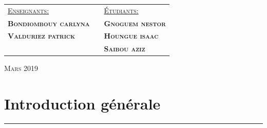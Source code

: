 \documentclass[12pt]{report}
\begin{document}
\begin{center}
		
	
		\vspace{3em}	
		\begin{tabular}{lll}
			\vspace{0.5em}
			 \textsc{\underline{Enseignants:}}	& \hspace{3em}	&	\textsc{\underline{Étudiants:}}		\\ 
			 \textsc{\textbf{\sc Bondiombouy carlyna }} & \hspace{15em}	&	\textsc{\textbf{\sc Gnoguem nestor}}	 \\				%
			 \textsc{\textbf{\sc Valduriez patrick}}	& \hspace{15em}	&	\textsc{\textbf{\sc Houngue isaac}}	 \\				%
													 	& \hspace{15em}	&	\textsc{\textbf{\sc Saibou aziz}}	 \\				%
		\end{tabular}

		\vspace{6.7em}																
		\textsc{\small Mars 2019}
		
		
	\end{center}
	
	\newpage
	\tableofcontents
	
	\newpage

	\section{\sc Introduction générale}
	\rule{1 \textwidth}{0.5pt} \textbf{}
	\vspace{2em}
\end{document}
